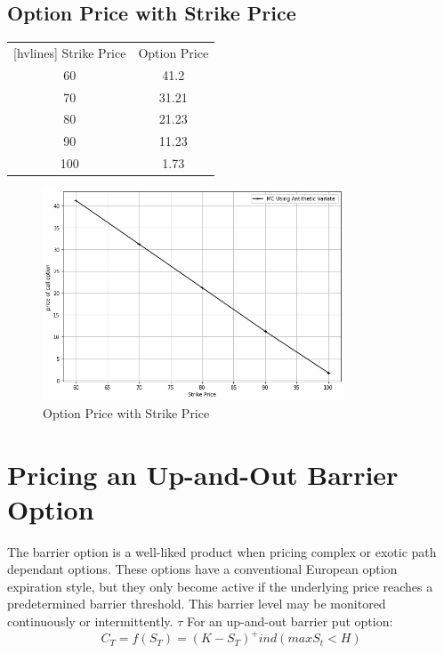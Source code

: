 \subsection{Option Price with Strike Price}

\begin{center}
	\begin{NiceTabular}{|c|c|}[hvlines]
		 Strike Price & Option Price\\ 
		60 & 41.2 \\ 
		70 & 31.21 \\
		80 & 21.23 \\
		90 & 11.23  \\
		100 & 1.73 \\
	\end{NiceTabular}
\end{center}

\begin{figure}[H]
	\begin{center}
		\includegraphics[width=0.8\textwidth]{mc_antithetic}
	\end{center}
	\caption{Option Price with Strike Price}
\end{figure}

\section{Pricing an Up-and-Out Barrier Option}
\noindent The barrier option is a well-liked product when pricing complex or exotic path dependant options. These options have a conventional European option expiration style, but they only become active if the underlying price reaches a predetermined barrier threshold. This barrier level may be monitored continuously or intermittently. $\tau$
For an up-and-out barrier put option:
$$C_{T}=f(S_{T})=(K-S_{T})^+ind( max S_{t}<H)$$

